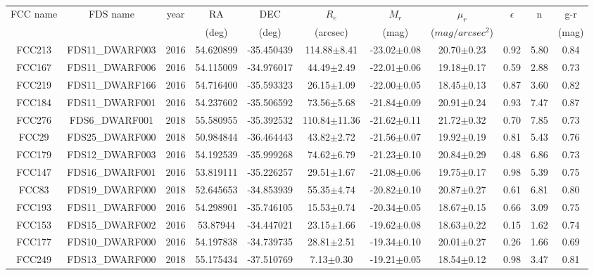 \documentclass{aa}
\begin{document}
\begin{table}
\begin{center}
\caption{}
{\renewcommand{\arraystretch}{1.}
\resizebox{18cm}{!} {
\begin{tabular}{|ccccccccccc|}
\hline 
FCC name & FDS name & year & RA & DEC & $R_e$ & $M_r$ & $\mu_r$  & $\epsilon$ & n & g-r \\ 
 &  &  & (deg) & (deg) & (arcsec) & (mag) & ($mag/arcsec^2$) &  & & (mag)\\
\hline \hline
FCC213 & FDS11\_DWARF003 & 2016 & 54.620899 & -35.450439 & 114.88$\pm$8.41 & -23.02$\pm$0.08 & 20.70$\pm$0.23 & 0.92 & 5.80 & 0.84\\
FCC167 & FDS11\_DWARF006 & 2016 & 54.115009 & -34.976017 & 44.49$\pm$2.49 & -22.01$\pm$0.06 & 19.18$\pm$0.17 & 0.59 & 2.88 & 0.73\\
FCC219 & FDS11\_DWARF166 & 2016 & 54.716400 & -35.593323 & 26.15$\pm$1.09 & -22.00$\pm$0.05 & 18.45$\pm$0.13 & 0.87 & 3.60 & 0.82\\
FCC184 & FDS11\_DWARF001 & 2016 & 54.237602 & -35.506592 & 73.56$\pm$5.68 & -21.84$\pm$0.09 & 20.91$\pm$0.24 & 0.93 & 7.47 & 0.87\\
FCC276 & FDS6\_DWARF001 & 2018 & 55.580955 & -35.392532 & 110.84$\pm$11.36 & -21.62$\pm$0.11 & 21.72$\pm$0.32 & 0.70 & 7.85 & 0.73\\
FCC29 & FDS25\_DWARF000 & 2018 & 50.984844 & -36.464443 & 43.82$\pm$2.72 & -21.56$\pm$0.07 & 19.92$\pm$0.19 & 0.81 & 5.43 & 0.76\\
FCC179 & FDS12\_DWARF003 & 2016 & 54.192539 & -35.999268 & 74.62$\pm$6.79 & -21.23$\pm$0.10 & 20.84$\pm$0.29 & 0.48 & 6.86 & 0.73\\
FCC147 & FDS16\_DWARF001 & 2016 & 53.819111 & -35.226257 & 29.51$\pm$1.67 & -21.08$\pm$0.06 & 19.75$\pm$0.17 & 0.98 & 5.39 & 0.75\\
FCC83 & FDS19\_DWARF000 & 2018 & 52.645653 & -34.853939 & 55.35$\pm$4.74 & -20.82$\pm$0.10 & 20.87$\pm$0.27 & 0.61 & 6.81 & 0.80\\
FCC193 & FDS11\_DWARF000 & 2016 & 54.298901 & -35.746105 & 15.53$\pm$0.74 & -20.34$\pm$0.05 & 18.67$\pm$0.15 & 0.66 & 3.09 & 0.75\\
FCC153 & FDS15\_DWARF002 & 2016 & 53.87944 & -34.447021 & 23.15$\pm$1.66 & -19.62$\pm$0.08 & 18.63$\pm$0.22 & 0.15 & 1.62 & 0.74\\
FCC177 & FDS10\_DWARF000 & 2016 & 54.197838 & -34.739735 & 28.81$\pm$2.51 & -19.34$\pm$0.10 & 20.01$\pm$0.27 & 0.26 & 1.66 & 0.69\\
FCC249 & FDS13\_DWARF000 & 2018 & 55.175434 & -37.510769 & 7.13$\pm$0.30 & -19.21$\pm$0.05 & 18.54$\pm$0.12 & 0.98 & 3.47 & 0.81\\

\end{tabular}}}
\end{center}
\end{table}
\end{document}
